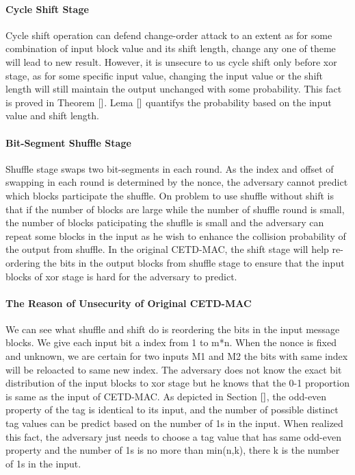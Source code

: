 \documentclass{article}
\begin{document}
\paragraph{Cycle Shift Stage}
Cycle shift operation can defend change-order attack to an extent as for some combination of input block value and its shift length, change any one of theme will lead to new result. However, it is unsecure to us cycle shift only before xor stage, as for some specific input value, changing the input value or the shift length will still maintain the output unchanged with some probability. This fact is proved in Theorem $\ref{}$. Lema $\ref{}$ quantifys the probability based on the input value and shift length. 
\paragraph{Bit-Segment Shuffle Stage}
Shuffle stage swaps two bit-segments in each round. As the index and offset of swapping in each round is determined by the nonce, the adversary cannot predict which blocks participate the shuffle. On problem to use shuffle without shift is that if the number of blocks are large while the number of shuffle round is small, the number of blocks paticipating the shuflle is small and the adversary can repeat some blocks in the input as he wish to enhance the collision probability of the output from shuffle.  In the original CETD-MAC, the shift stage will help re-ordering the bits in the output blocks from shuffle stage to ensure that the input blocks of xor stage is hard for the adversary to predict. 
\paragraph{The Reason of Unsecurity of Original CETD-MAC}
We can see what shuffle and shift do is reordering the bits in the input message
blocks. We give each input bit a index from 1 to m*n. When the nonce is fixed
and unknown, we are certain for two inputs M1 and M2 the bits with same index
will be reloacted to same new index. The adversary does not know the exact bit
distribution of the input blocks to xor stage but he knows that the 0-1
proportion is same as the input of CETD-MAC. As depicted in Section $\ref{}$, the odd-even property of the tag is identical to its input, and the number of possible distinct tag values can be predict based on the number of 1s in the input. When realized this fact, the adversary just needs to choose a tag value that has same odd-even property and the number of 1s is no more than min(n,k), there k is the number of 1s in the input.
\end{document}
